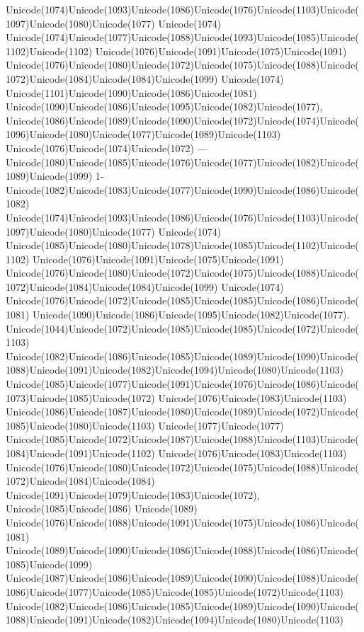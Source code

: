 \documentclass[a4paper,11pt]{report}
\begin{document}
{{Unicode(1074)Unicode(1093)Unicode(1086)Unicode(1076)Unicode(1103)Unicode(1097)Unicode(1080)Unicode(1077)
Unicode(1074)
Unicode(1074)Unicode(1077)Unicode(1088)Unicode(1093)Unicode(1085)Unicode(1102)Unicode(1102)
Unicode(1076)Unicode(1091)Unicode(1075)Unicode(1091)
Unicode(1076)Unicode(1080)Unicode(1072)Unicode(1075)Unicode(1088)Unicode(1072)Unicode(1084)Unicode(1084)Unicode(1099)
Unicode(1074) Unicode(1101)Unicode(1090)Unicode(1086)Unicode(1081)
Unicode(1090)Unicode(1086)Unicode(1095)Unicode(1082)Unicode(1077),
Unicode(1086)Unicode(1089)Unicode(1090)Unicode(1072)Unicode(1074)Unicode(1096)Unicode(1080)Unicode(1077)Unicode(1089)Unicode(1103)
Unicode(1076)Unicode(1074)Unicode(1072) ---
Unicode(1080)Unicode(1085)Unicode(1076)Unicode(1077)Unicode(1082)Unicode(1089)Unicode(1099)
1-Unicode(1082)Unicode(1083)Unicode(1077)Unicode(1090)Unicode(1086)Unicode(1082)
Unicode(1074)Unicode(1093)Unicode(1086)Unicode(1076)Unicode(1103)Unicode(1097)Unicode(1080)Unicode(1077)
Unicode(1074)
Unicode(1085)Unicode(1080)Unicode(1078)Unicode(1085)Unicode(1102)Unicode(1102)
Unicode(1076)Unicode(1091)Unicode(1075)Unicode(1091)
Unicode(1076)Unicode(1080)Unicode(1072)Unicode(1075)Unicode(1088)Unicode(1072)Unicode(1084)Unicode(1084)Unicode(1099)
Unicode(1074)
Unicode(1076)Unicode(1072)Unicode(1085)Unicode(1085)Unicode(1086)Unicode(1081)
Unicode(1090)Unicode(1086)Unicode(1095)Unicode(1082)Unicode(1077).  Unicode(1044)Unicode(1072)Unicode(1085)Unicode(1085)Unicode(1072)Unicode(1103)
Unicode(1082)Unicode(1086)Unicode(1085)Unicode(1089)Unicode(1090)Unicode(1088)Unicode(1091)Unicode(1082)Unicode(1094)Unicode(1080)Unicode(1103)
Unicode(1085)Unicode(1077)Unicode(1091)Unicode(1076)Unicode(1086)Unicode(1073)Unicode(1085)Unicode(1072)
Unicode(1076)Unicode(1083)Unicode(1103)
Unicode(1086)Unicode(1087)Unicode(1080)Unicode(1089)Unicode(1072)Unicode(1085)Unicode(1080)Unicode(1103)
Unicode(1077)Unicode(1077)
Unicode(1085)Unicode(1072)Unicode(1087)Unicode(1088)Unicode(1103)Unicode(1084)Unicode(1091)Unicode(1102)
Unicode(1076)Unicode(1083)Unicode(1103)
Unicode(1076)Unicode(1080)Unicode(1072)Unicode(1075)Unicode(1088)Unicode(1072)Unicode(1084)Unicode(1084)
Unicode(1091)Unicode(1079)Unicode(1083)Unicode(1072),
Unicode(1085)Unicode(1086) Unicode(1089)
Unicode(1076)Unicode(1088)Unicode(1091)Unicode(1075)Unicode(1086)Unicode(1081)
Unicode(1089)Unicode(1090)Unicode(1086)Unicode(1088)Unicode(1086)Unicode(1085)Unicode(1099)
Unicode(1087)Unicode(1086)Unicode(1089)Unicode(1090)Unicode(1088)Unicode(1086)Unicode(1077)Unicode(1085)Unicode(1085)Unicode(1072)Unicode(1103)
Unicode(1082)Unicode(1086)Unicode(1085)Unicode(1089)Unicode(1090)Unicode(1088)Unicode(1091)Unicode(1082)Unicode(1094)Unicode(1080)Unicode(1103)
}}
\end{document}
